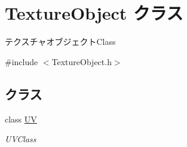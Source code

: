 \hypertarget{class_texture_object}{}\section{Texture\+Object クラス}
\label{class_texture_object}


テクスチャオブジェクト\+Class  




{\ttfamily \#include $<$Texture\+Object.\+h$>$}

\subsection*{クラス}
\begin{DoxyCompactItemize}
\item 
class \mbox{\hyperlink{class_texture_object_1_1_u_v}{UV}}
\begin{DoxyCompactList}\small\item\em U\+V\+Class \end{DoxyCompactList}\end{DoxyCompactItemize}
